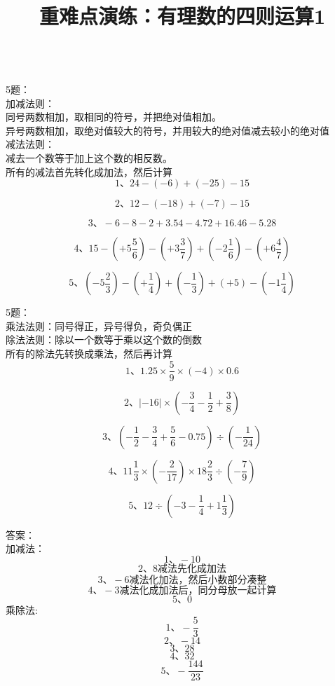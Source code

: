 \documentclass[fleqn]{article}
\title{重难点演练：有理数的四则运算1}
\date{}
\begin{document}
  \hspace{4cm}{\Large 重难点演练：有理数的四则运算1}
  \\
  5题：\\
  加减法则：\\
  同号两数相加，取相同的符号，并把绝对值相加。\\
  异号两数相加，取绝对值较大的符号，并用较大的绝对值减去较小的绝对值\\
  减法法则：\\
  减去一个数等于加上这个数的相反数。\\
  所有的减法首先转化成加法，然后计算\\
	\[\text{1、}24-(-6)+(-25)-15\]

	\[\text{2、}12-(-18)+(-7)-15\]

	\[\text{3、}-6-8-2+3.54-4.72+16.46-5.28\]

	\[\text{4、}15-(+5\frac 56)-(+3\frac 37)+(-2\frac 16)-(+6\frac 47)\]

	\[\text{5、}(-5\frac 23)-(+\frac 14)+(-\frac 13)+(+5)-(-1\frac 14)\]

  5题：\\
  乘法法则：同号得正，异号得负，奇负偶正\\
  除法法则：除以一个数等于乘以这个数的倒数\\
  所有的除法先转换成乘法，然后再计算\\
	\[\text{1、}1.25\times\frac59\times(-4)\times0.6\]

	\[\text{2、}|-16|\times(-\frac34-\frac12+\frac38)\]

	\[\text{3、}(-\frac12-\frac34+\frac56-0.75)\div(-\frac1{24})\]

	\[\text{4、}11\frac13\times(-\frac2{17})\times18\frac23\div(-\frac79)\]

	\[\text{5、}12\div(-3-\frac14+1\frac13)\]

  \newpage
  \noindent 答案：\\
  加减法：\\
	\[\text{1、}-10\]
	\[\text{2、}8\text{减法先化成加法}\]
	\[\text{3、}-6\text{减法化加法，然后小数部分凑整}\]
	\[\text{4、}-3\text{减法化成加法后，同分母放一起计算}\]
	\[\text{5、}0\]
  乘除法:\\
	\[\text{1、}-\frac53\]
	\[\text{2、}-14\]
	\[\text{3、}28\]
	\[\text{4、}32\]
	\[\text{5、}-\frac{144}{23}\]
  
\end{document}
